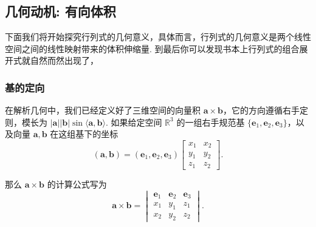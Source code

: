 \documentclass[10pt,openany]{article}
\theoremstyle{thmstyle} %
\theoremstyle{defstyle} %
\theoremstyle{prostyle} %
\theoremstyle{exastyle}
\theoremstyle{remstyle}
\newcommand{\R}{\mathbb{R}}
\begin{document}
\subsection{几何动机: 有向体积}
\label{2.3}

下面我们将开始探究行列式的几何意义，具体而言，行列式的几何意义是两个线性空间之间的线性映射带来的体积伸缩量. 到最后你可以发现书本上行列式的组合展开式就自然而然出现了，

\subsubsection{基的定向}\label{Sec 2.3.1}


在解析几何中，我们已经定义好了三维空间的向量积 \( \bm{a} \times \bm{b} \)，它的方向遵循右手定则，模长为 \( |\bm{a}||\bm{b}|\sin \langle \bm{a},\bm{b} \rangle \). 如果给定空间 \( \R^3 \) 的一组右手规范基 \( \{\bm{e}_1,\bm{e}_2,\bm{e}_3 \} \)，以及向量 \( \bm{a}, \bm{b} \) 在这组基下的坐标
\[ (\bm{a},\bm{b})=(\bm{e}_1,\bm{e}_2,\bm{e}_3)\begin{bmatrix}
	x_1 & x_2 \\ y_1 & y_2 \\ z_1 & z_2
\end{bmatrix}. \]

那么 \( \bm{a} \times \bm{b} \) 的计算公式写为
\[ \bm{a} \times \bm{b}= \begin{vmatrix}
	\bm{e}_1 & \bm{e}_2 & \bm{e}_3 \\
	x_1 & y_1 & z_1 \\
	x_2 & y_2 & z_2
\end{vmatrix}. \]
\end{document}

